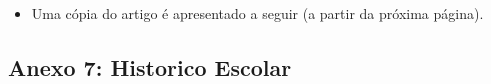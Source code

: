 
\begin{figure}[!h]
 \centering
 \label{fig:comprovante_vmil}
\end{figure}

\begin{itemize}
	\item Uma cópia do artigo é apresentado a seguir (a partir da próxima página).
\end{itemize}
\clearpage



\subsection*{Anexo 7: Historico Escolar} \label{anexo:historico_escolar}


